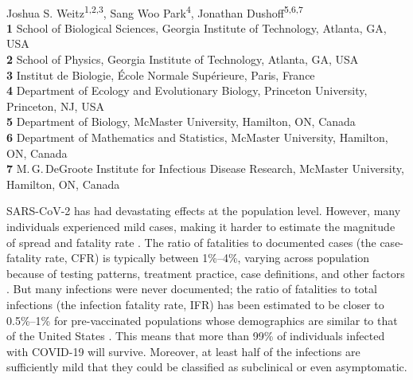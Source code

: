 \documentclass[12pt]{article}
\date{\today}
\begin{document}
\begin{flushleft}{
	\Large
	\textbf{}
}
\newline
\\
Joshua S. Weitz\textsuperscript{1,2,3},
Sang Woo Park\textsuperscript{4},
Jonathan Dushoff\textsuperscript{5,6,7}
\\
\bigskip
\textbf{1} School of Biological Sciences, Georgia Institute of Technology, Atlanta, GA, USA
\\
\textbf{2} School of Physics, Georgia Institute of Technology, Atlanta, GA, USA
\\
\textbf{3} Institut de Biologie, \'{E}cole Normale Sup\'{e}rieure, Paris, France
\\
\textbf{4} Department of Ecology and Evolutionary Biology, Princeton University, Princeton, NJ, USA
\\
\textbf{5} Department of Biology, McMaster University, Hamilton, ON, Canada
\\
\textbf{6} Department of Mathematics and Statistics, McMaster University, Hamilton, ON, Canada
\\
\textbf{7} M.\,G.\,DeGroote Institute for Infectious Disease Research, McMaster University, Hamilton, ON, Canada
\\
\bigskip

\bigskip
\end{flushleft}

SARS-CoV-2 has had devastating effects at the population level.
However, many individuals experienced mild cases, making it harder to estimate the magnitude of spread and fatality rate \citep{park2020time}. 
The ratio of fatalities to documented cases (the case-fatality rate, CFR) is typically between 1\%--4\%, varying across population because of testing patterns, treatment practice, case definitions, and other factors \citep{rajgor2020many,VERITY2020669,yang2020early}.
But many infections were never documented;
the ratio of fatalities to total infections (the infection fatality rate, IFR) has been estimated to be closer to 0.5\%--1\% for pre-vaccinated populations whose demographics are similar to that of the United States \citep{levin2020assessing}. 
This means that more than 99\% of individuals infected with COVID-19 will survive. 
Moreover, at least half of the infections are sufficiently mild that they could be classified as subclinical or even asymptomatic. 
\end{document}
